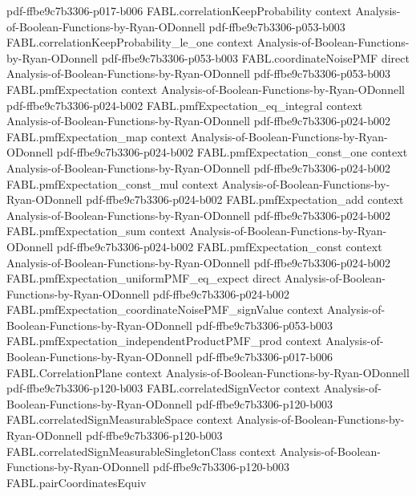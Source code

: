 \begin{theorem}
  {pdf-ffbe9c7b3306-p017-b006}
\proofstep
  {FABL.correlationKeepProbability}
  {context}
  {Analysis-of-Boolean-Functions-by-Ryan-ODonnell}
  {pdf-ffbe9c7b3306-p053-b003}
\proofstep
  {FABL.correlationKeepProbability_le_one}
  {context}
  {Analysis-of-Boolean-Functions-by-Ryan-ODonnell}
  {pdf-ffbe9c7b3306-p053-b003}
\proofstep
  {FABL.coordinateNoisePMF}
  {direct}
  {Analysis-of-Boolean-Functions-by-Ryan-ODonnell}
  {pdf-ffbe9c7b3306-p053-b003}
\proofstep
  {FABL.pmfExpectation}
  {context}
  {Analysis-of-Boolean-Functions-by-Ryan-ODonnell}
  {pdf-ffbe9c7b3306-p024-b002}
\proofstep
  {FABL.pmfExpectation_eq_integral}
  {context}
  {Analysis-of-Boolean-Functions-by-Ryan-ODonnell}
  {pdf-ffbe9c7b3306-p024-b002}
\proofstep
  {FABL.pmfExpectation_map}
  {context}
  {Analysis-of-Boolean-Functions-by-Ryan-ODonnell}
  {pdf-ffbe9c7b3306-p024-b002}
\proofstep
  {FABL.pmfExpectation_const_one}
  {context}
  {Analysis-of-Boolean-Functions-by-Ryan-ODonnell}
  {pdf-ffbe9c7b3306-p024-b002}
\proofstep
  {FABL.pmfExpectation_const_mul}
  {context}
  {Analysis-of-Boolean-Functions-by-Ryan-ODonnell}
  {pdf-ffbe9c7b3306-p024-b002}
\proofstep
  {FABL.pmfExpectation_add}
  {context}
  {Analysis-of-Boolean-Functions-by-Ryan-ODonnell}
  {pdf-ffbe9c7b3306-p024-b002}
\proofstep
  {FABL.pmfExpectation_sum}
  {context}
  {Analysis-of-Boolean-Functions-by-Ryan-ODonnell}
  {pdf-ffbe9c7b3306-p024-b002}
\proofstep
  {FABL.pmfExpectation_const}
  {context}
  {Analysis-of-Boolean-Functions-by-Ryan-ODonnell}
  {pdf-ffbe9c7b3306-p024-b002}
\proofstep
  {FABL.pmfExpectation_uniformPMF_eq_expect}
  {direct}
  {Analysis-of-Boolean-Functions-by-Ryan-ODonnell}
  {pdf-ffbe9c7b3306-p024-b002}
\proofstep
  {FABL.pmfExpectation_coordinateNoisePMF_signValue}
  {context}
  {Analysis-of-Boolean-Functions-by-Ryan-ODonnell}
  {pdf-ffbe9c7b3306-p053-b003}
\proofstep
  {FABL.pmfExpectation_independentProductPMF_prod}
  {context}
  {Analysis-of-Boolean-Functions-by-Ryan-ODonnell}
  {pdf-ffbe9c7b3306-p017-b006}
\proofstep
  {FABL.CorrelationPlane}
  {context}
  {Analysis-of-Boolean-Functions-by-Ryan-ODonnell}
  {pdf-ffbe9c7b3306-p120-b003}
\proofstep
  {FABL.correlatedSignVector}
  {context}
  {Analysis-of-Boolean-Functions-by-Ryan-ODonnell}
  {pdf-ffbe9c7b3306-p120-b003}
\proofstep
  {FABL.correlatedSignMeasurableSpace}
  {context}
  {Analysis-of-Boolean-Functions-by-Ryan-ODonnell}
  {pdf-ffbe9c7b3306-p120-b003}
\proofstep
  {FABL.correlatedSignMeasurableSingletonClass}
  {context}
  {Analysis-of-Boolean-Functions-by-Ryan-ODonnell}
  {pdf-ffbe9c7b3306-p120-b003}
\proofstep
  {FABL.pairCoordinatesEquiv}

\end{theorem}
